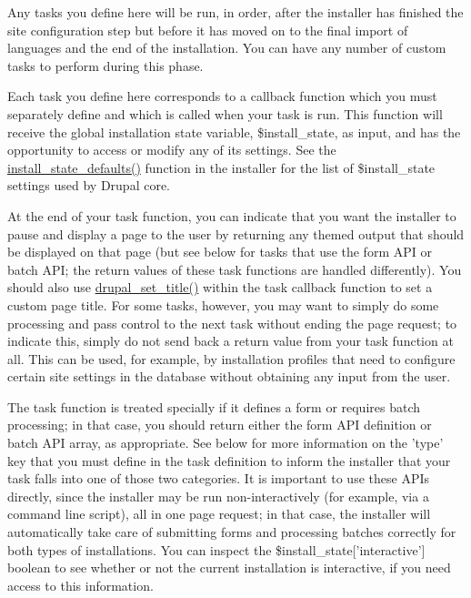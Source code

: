 Any tasks you define here will be run, in order, after the installer has finished the site configuration step but before it has moved on to the final import of languages and the end of the installation. You can have any number of custom tasks to perform during this phase.

Each task you define here corresponds to a callback function which you must separately define and which is called when your task is run. This function will receive the global installation state variable, \$install\_\-state, as input, and has the opportunity to access or modify any of its settings. See the \hyperlink{install_8core_8inc_ab52bef71652d133045e4182da84a33b8}{install\_\-state\_\-defaults()} function in the installer for the list of \$install\_\-state settings used by Drupal core.

At the end of your task function, you can indicate that you want the installer to pause and display a page to the user by returning any themed output that should be displayed on that page (but see below for tasks that use the form API or batch API; the return values of these task functions are handled differently). You should also use \hyperlink{bootstrap_8inc_a1994d49eb621df71fe1306e13b7e4910}{drupal\_\-set\_\-title()} within the task callback function to set a custom page title. For some tasks, however, you may want to simply do some processing and pass control to the next task without ending the page request; to indicate this, simply do not send back a return value from your task function at all. This can be used, for example, by installation profiles that need to configure certain site settings in the database without obtaining any input from the user.

The task function is treated specially if it defines a form or requires batch processing; in that case, you should return either the form API definition or batch API array, as appropriate. See below for more information on the 'type' key that you must define in the task definition to inform the installer that your task falls into one of those two categories. It is important to use these APIs directly, since the installer may be run non-\/interactively (for example, via a command line script), all in one page request; in that case, the installer will automatically take care of submitting forms and processing batches correctly for both types of installations. You can inspect the \$install\_\-state\mbox{[}'interactive'\mbox{]} boolean to see whether or not the current installation is interactive, if you need access to this information.


